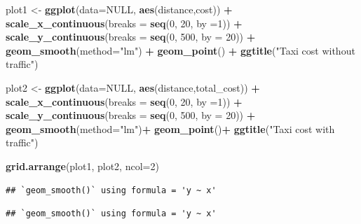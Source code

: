 \documentclass[
]{book}
\newenvironment{Shaded}{\begin{snugshade}}{\end{snugshade}}
\newcommand{\AttributeTok}[1]{\textcolor[rgb]{0.13,0.29,0.53}{#1}}
\newcommand{\ConstantTok}[1]{\textcolor[rgb]{0.56,0.35,0.01}{#1}}
\newcommand{\DecValTok}[1]{\textcolor[rgb]{0.00,0.00,0.81}{#1}}
\newcommand{\FunctionTok}[1]{\textcolor[rgb]{0.13,0.29,0.53}{\textbf{#1}}}
\newcommand{\NormalTok}[1]{#1}
\newcommand{\OtherTok}[1]{\textcolor[rgb]{0.56,0.35,0.01}{#1}}
\newcommand{\SpecialCharTok}[1]{\textcolor[rgb]{0.81,0.36,0.00}{\textbf{#1}}}
\newcommand{\StringTok}[1]{\textcolor[rgb]{0.31,0.60,0.02}{#1}}
\begin{document}
\begin{Shaded}
\begin{Highlighting}[]
\NormalTok{plot1 }\OtherTok{\textless{}{-}} \FunctionTok{ggplot}\NormalTok{(}\AttributeTok{data=}\ConstantTok{NULL}\NormalTok{, }\FunctionTok{aes}\NormalTok{(distance,cost)) }\SpecialCharTok{+}
  \FunctionTok{scale\_x\_continuous}\NormalTok{(}\AttributeTok{breaks =} \FunctionTok{seq}\NormalTok{(}\DecValTok{0}\NormalTok{, }\DecValTok{20}\NormalTok{, }\AttributeTok{by =}\DecValTok{1}\NormalTok{)) }\SpecialCharTok{+}
  \FunctionTok{scale\_y\_continuous}\NormalTok{(}\AttributeTok{breaks =} \FunctionTok{seq}\NormalTok{(}\DecValTok{0}\NormalTok{, }\DecValTok{500}\NormalTok{, }\AttributeTok{by =} \DecValTok{20}\NormalTok{)) }\SpecialCharTok{+} 
  \FunctionTok{geom\_smooth}\NormalTok{(}\AttributeTok{method=}\StringTok{"lm"}\NormalTok{) }\SpecialCharTok{+}
  \FunctionTok{geom\_point}\NormalTok{() }\SpecialCharTok{+}
  \FunctionTok{ggtitle}\NormalTok{(}\StringTok{"Taxi cost without traffic"}\NormalTok{)}

\NormalTok{plot2 }\OtherTok{\textless{}{-}} \FunctionTok{ggplot}\NormalTok{(}\AttributeTok{data=}\ConstantTok{NULL}\NormalTok{, }\FunctionTok{aes}\NormalTok{(distance,total\_cost)) }\SpecialCharTok{+}
  \FunctionTok{scale\_x\_continuous}\NormalTok{(}\AttributeTok{breaks =} \FunctionTok{seq}\NormalTok{(}\DecValTok{0}\NormalTok{, }\DecValTok{20}\NormalTok{, }\AttributeTok{by =}\DecValTok{1}\NormalTok{)) }\SpecialCharTok{+}
  \FunctionTok{scale\_y\_continuous}\NormalTok{(}\AttributeTok{breaks =} \FunctionTok{seq}\NormalTok{(}\DecValTok{0}\NormalTok{, }\DecValTok{500}\NormalTok{, }\AttributeTok{by =} \DecValTok{20}\NormalTok{)) }\SpecialCharTok{+} 
  \FunctionTok{geom\_smooth}\NormalTok{(}\AttributeTok{method=}\StringTok{"lm"}\NormalTok{)}\SpecialCharTok{+}
  \FunctionTok{geom\_point}\NormalTok{()}\SpecialCharTok{+}
  \FunctionTok{ggtitle}\NormalTok{(}\StringTok{"Taxi cost with traffic"}\NormalTok{)}

\FunctionTok{grid.arrange}\NormalTok{(plot1, plot2, }\AttributeTok{ncol=}\DecValTok{2}\NormalTok{)}
\end{Highlighting}
\end{Shaded}

\begin{verbatim}
## `geom_smooth()` using formula = 'y ~ x'
\end{verbatim}

\begin{verbatim}
## `geom_smooth()` using formula = 'y ~ x'
\end{verbatim}
\end{document}
